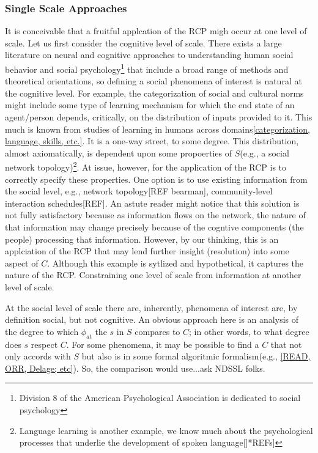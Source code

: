 \documentclass{article}
\begin{document}
\subsubsection{Single Scale Approaches}
It is conceivable that a fruitful applcation of the RCP migh occur at one level of scale.   
Let us first consider the cognitive level of scale.  There exists a large literature on neural and cognitive approaches to understanding human social behavior and social psychology\footnote{Division 8 of the American Psychological Association is dedicated to social psychology } that include a broad range of methods and theoretical orientations, so defining a social phenomena of interest is natural at the cognitive level.  For example, the categorization of social and cultural norms might include some type of learning mechanism for which the end state of an agent/person depends, critically, on the distribution of inputs provided to it.  This much is known from studies of learning in humans across domains\ref{categorization, language, skills, etc.}.  It is a one-way street, to some degree.  This distribution, almost axiomatically, is dependent upon some propoerties of $S$(e.g., a social network topology)\footnote{Language learning is another example, we know much about the psychological processes that underlie the development of spoken language[]*REFs]}.  At issue, however, for the application of the RCP is to correctly specify these properties.  One option is to use existing information from the social level, e.g., network topology[REF bearman], community-level interaction schedules[REF].  An astute reader might notice that this solution is not fully satisfactory because as information flows on the network, the nature of that information may change precisely because of the cogntive components (the people) processing that information. However, by our thinking, this is an applciation of the RCP that may lend further insight (resolution) into some aspect of $C$.  Although this example is sytlized and hypothetical, it captures the nature of the RCP.  Constraining one level of scale from information at another level of scale.   

At the social level of scale there are, inherently, phenomena of interest are, by definition social, but not cognitive.  An obvious approach here is an analysis of the degree to which $\phi_{at}$ the $s$ in $S$ compares to $C$; in other words, to what degree does $s$ respect $C$.  For some phenomena, it may be possible to find a $C$ that not only accords with $S$ but also is in some formal algoritmic formalism(e.g., \ref{READ, ORR, Delage; etc}).  So, the comparison would use...ask NDSSL folks.
\end{document}

